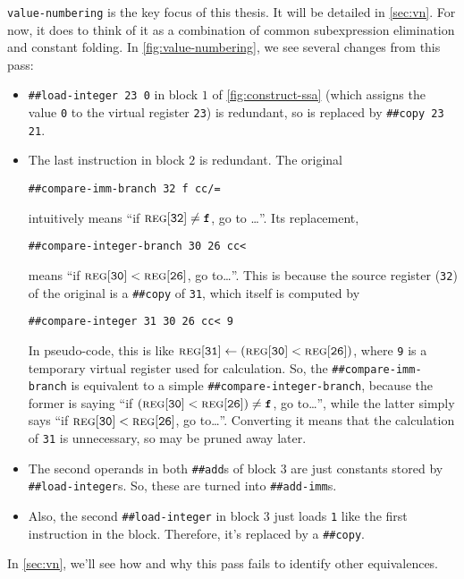 \Verb|value-numbering| is the key focus of this thesis.  It will be detailed
in \cref{sec:vn}.  For now, it does to think of it as a combination of common
subexpression elimination and constant folding.  In \vref{fig:value-numbering}, 
we see several changes from this pass:
%
\begin{itemize}
%
  \item \Verb|##load-integer 23 0| in block $1$ of \vref{fig:construct-ssa}
  (which assigns the value \Verb|0| to the virtual register \Verb|23|) is
  redundant, so is replaced by \Verb|##copy 23 21|.
%
  \item \begin{sloppypar}
  The last instruction in block $2$ is redundant.  The original
  \begin{center} \Verb|##compare-imm-branch 32 f cc/=| \end{center}
  intuitively means ``if $\textsc{reg}[\texttt{32}] \ne \texttt{\textbf{f}}$, go to \ldots''.
  Its replacement,
  \begin{center} \Verb|##compare-integer-branch 30 26 cc<| \end{center}
  means ``if $\textsc{reg}[\texttt{30}] < \textsc{reg}[\texttt{26}]$, go to\ldots''.  This is because the source
  register (\Verb|32|) of the original is a \Verb|##copy| of \Verb|31|, which
  itself is computed by
  \begin{center} \Verb|##compare-integer 31 30 26 cc< 9|\end{center}
  In pseudo-code, this is like $\textsc{reg}[\texttt{31}] \gets (\textsc{reg}[\texttt{30}] < \textsc{reg}[\texttt{26}])$, where
  \Verb|9| is a temporary virtual register used for calculation.  So, the
  \Verb|##compare-imm-branch| is equivalent to a simple
  \Verb|##compare-integer-branch|, because the former is saying ``if $(\textsc{reg}[\texttt{30}]
  < \textsc{reg}[\texttt{26}]) \ne \texttt{\textbf{f}}$, go to\ldots'', while the latter simply
  says ``if $\textsc{reg}[\texttt{30}] < \textsc{reg}[\texttt{26}]$, go to\ldots''.  Converting it means that the
  calculation of \Verb|31| is unnecessary, so may be pruned away later.
  \end{sloppypar}
%
  \item \begin{sloppypar} The second operands in both \Verb|##add|s of block
  $3$ are just constants stored by \Verb|##load-integer|s.  So, these are
  turned into \Verb|##add-imm|s.
  \end{sloppypar}
%
  \item Also, the second \Verb|##load-integer| in block $3$ just loads
  \Verb|1| like the first instruction in the block.  Therefore, it's replaced
  by a \Verb|##copy|.
\end{itemize}
%
\noindent In \cref{sec:vn}, we'll see how and why this pass fails to identify
other equivalences.

